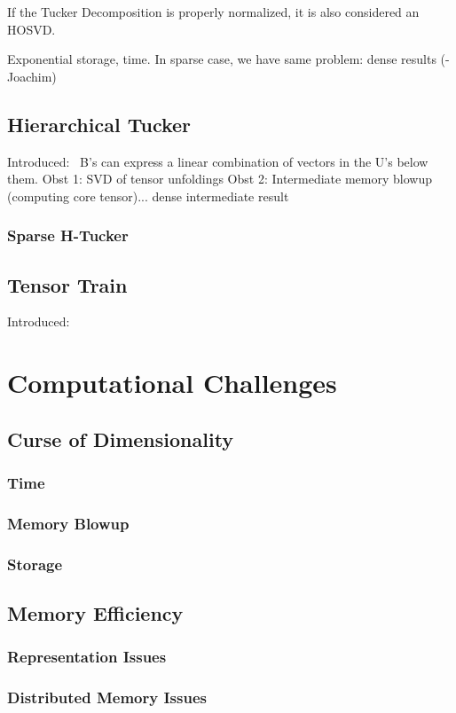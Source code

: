 \documentclass[10pt]{article}
\begin{document}
If the Tucker Decomposition is properly normalized, it is also considered an HOSVD.

Exponential storage, time. In sparse case, we have same problem: dense results (-Joachim)
\subsection{Hierarchical Tucker}
Introduced:~\cite{Grasedyck:2010:HSV:1958286.1958311}
B's can express a linear combination of vectors in the U's below them.
Obst 1: SVD of tensor unfoldings
Obst 2: Intermediate memory blowup (computing core tensor)... dense intermediate result
\subsubsection{Sparse H-Tucker}
\subsection{Tensor Train}
Introduced:~\cite{Oseledets:2011:TD:2079141.2079149}
\section{Computational Challenges}
\subsection{Curse of Dimensionality}
\subsubsection{Time}
\subsubsection{Memory Blowup}
\subsubsection{Storage}
\subsection{Memory Efficiency}
\subsubsection{Representation Issues}
\subsubsection{Distributed Memory Issues}
\end{document}
